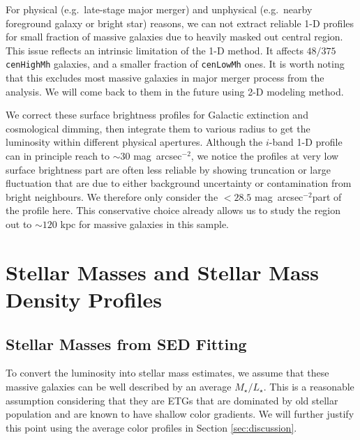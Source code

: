 \documentclass{emulateapj}
\def\sb{mag~arcsec$^{-2}$}
\def\rbcg{\texttt{cenHighMh}}
\def\nbcg{\texttt{cenLowMh}}
\def\m2l{{$M_{\star}/L_{\star}$}}
\begin{document}
\begin{CJK*}{UTF8}{gbsn}
    For physical (e.g.\ late-stage major merger) and unphysical (e.g.\ nearby 
    foreground galaxy or bright star) reasons, we can not extract reliable 1-D 
    profiles for small fraction of massive galaxies due to heavily masked out 
    central region. 
    This issue reflects an intrinsic limitation of the 1-D method. 
    It affects $48/375$ \rbcg{} galaxies, and a smaller fraction of \nbcg{} ones. 
    It is worth noting that this excludes most massive galaxies in major merger 
    process from the analysis. 
    We will come back to them in the future using 2-D modeling method.
    
    We correct these surface brightness profiles for Galactic extinction and 
    cosmological dimming, then integrate them to various radius to get the 
    luminosity within different physical apertures.  
    Although the $i$-band 1-D profile can in principle reach to $\sim 30$ \sb, 
    we notice the profiles at very low surface brightness part are often less 
    reliable by showing truncation or large fluctuation that are due to either 
    background uncertainty or contamination from bright neighbours.
    We therefore only consider the $<28.5$ \sb part of the profile here. 
    This conservative choice already allows us to study the region out to 
    $\sim 120$ kpc for massive galaxies in this sample.  
     

    

\section{Stellar Masses and Stellar Mass Density Profiles}
    \label{sec:mstar}
    
\subsection{Stellar Masses from SED Fitting}
    \label{ssec:isedfit}
   
    To convert the luminosity into stellar mass estimates, we assume that these massive 
    galaxies can be well described by an average \m2l{}. 
    This is a reasonable assumption considering that they are ETGs that are dominated by 
    old stellar population and are known to have shallow color gradients. 
    We will further justify this point using the average color profiles in Section
    \ref{sec:discussion}.


\end{CJK*}
\end{document}
